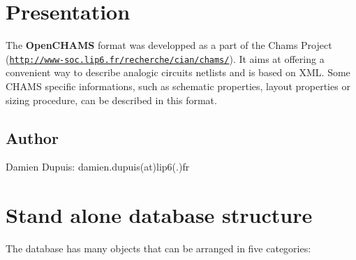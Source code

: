 \hypertarget{openchams_openChamsPres}{}\section{Presentation}\label{openchams_openChamsPres}
The {\bfseries Open\+C\+H\+A\+MS} format was developped as a part of the Chams Project (\href{http://www-soc.lip6.fr/recherche/cian/chams/}{\tt http\+://www-\/soc.\+lip6.\+fr/recherche/cian/chams/}). It aims at offering a convenient way to describe analogic circuits\textquotesingle{} netlists and is based on X\+ML. Some C\+H\+A\+MS specific informations, such as schematic properties, layout properties or sizing procedure, can be described in this format.~\newline
 \hypertarget{openchams_openChamsAutrhos}{}\subsection{Author}\label{openchams_openChamsAutrhos}
Damien Dupuis\+: damien.\+dupuis(at)lip6(.)fr\hypertarget{openchams_openChamsDB}{}\section{Stand alone database structure}\label{openchams_openChamsDB}
The database has many objects that can be arranged in five categories\+:
